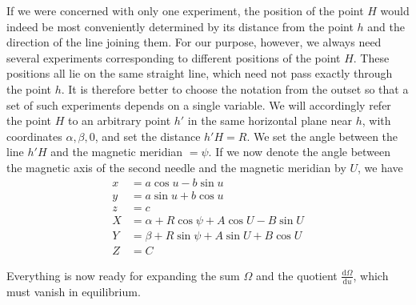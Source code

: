If we were concerned with only one experiment, the position of the point $H$ would indeed be most conveniently determined by its distance from the point $h$ and the direction of the line joining them. For our purpose, however, we always need several experiments corresponding to different positions of the point $H$. These positions all lie on the same straight line, which need not pass exactly through the point $h$. It is therefore better to choose the notation from the outset so that a set of such experiments depends on a single variable. We will accordingly refer the point $H$ to an arbitrary point $h'$ in the same horizontal plane near $h$, with coordinates $\alpha,\beta,0$, and set the distance $h'H=R$. We set the angle between the line $h'H$ and the magnetic meridian $=\psi$. If we now denote the angle between the magnetic axis of the second needle and the magnetic meridian by $U$, we have
\[
\begin{aligned}
x&=a\cos u-b\sin u\\
y&=a\sin u+b\cos u\\
z&=c\\
X&=\alpha+R\cos\psi+A\cos U-B\sin U\\
Y&=\beta+R\sin\psi+A\sin U+B\cos U\\
Z&=C
\end{aligned}
\]

Everything is now ready for expanding the sum $\Omega$ and the quotient $\frac{\mathrm{d}\Omega}{\mathrm{d}u}$, which must vanish in equilibrium.

